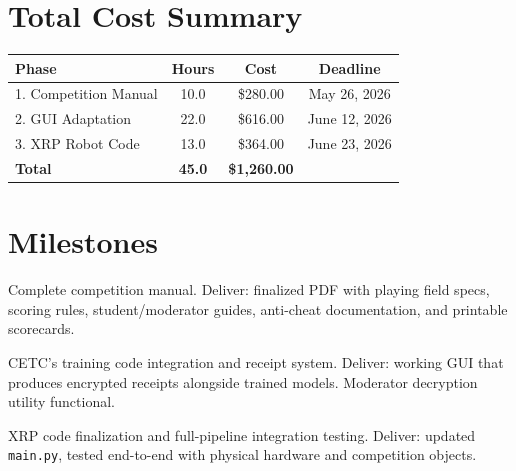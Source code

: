 \documentclass[a4paper]{article}
\begin{document}
\section*{Total Cost Summary}

\begin{center}
\begin{tabular}{lccc}
\toprule
\textbf{Phase} & \textbf{Hours} & \textbf{Cost} & \textbf{Deadline} \\
\midrule
1. Competition Manual & 10.0 & \$280.00 & May 26, 2026 \\
2. GUI Adaptation & 22.0 & \$616.00 & June 12, 2026 \\
3. XRP Robot Code & 13.0 & \$364.00 & June 23, 2026 \\
\midrule
\textbf{Total} & \textbf{45.0} & \textbf{\$1,260.00} & \\
\bottomrule
\end{tabular}
\end{center}

\section*{Milestones}

\begin{description}[leftmargin=!,labelwidth=5em]
    \item[May 26, 2026] Complete competition manual. Deliver: finalized PDF with playing field specs, scoring rules, student/moderator guides, anti-cheat documentation, and printable scorecards.

    \item[June 9--12, 2026] CETC's training code integration and receipt system. Deliver: working GUI that produces encrypted receipts alongside trained models. Moderator decryption utility functional.

    \item[June 19--23, 2026] XRP code finalization and full-pipeline integration testing. Deliver: updated \texttt{main.py}, tested end-to-end with physical hardware and competition objects.
\end{description}

\end{document}

